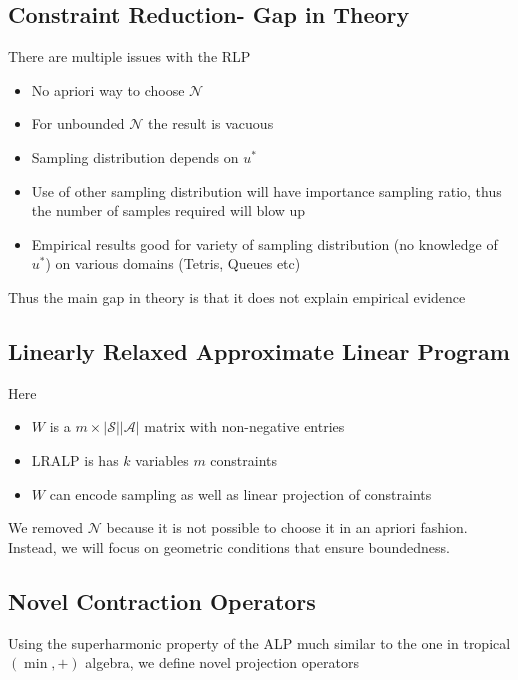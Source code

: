 \documentclass{article}
\renewcommand{\S}{\mathcal{S}}
\newcommand{\A}{\mathcal{A}}
\newcommand{\minp}{(\min,+)}
\newcommand{\N}{\mathcal{N}}
\begin{document}
\subsection{Constraint Reduction- Gap in Theory}
There are multiple issues with the RLP
\begin{itemize}
\item No apriori way to choose $\N$
\item For unbounded $\N$ the result is vacuous
\item Sampling distribution depends on $u^*$
\item Use of other sampling distribution will have importance sampling ratio, thus the number of samples required will blow up
\item \cite{farias2006tetris,de2003linear,de2004constraint} Empirical results good for variety of sampling distribution (no knowledge of $u^*$) on various domains (Tetris, Queues etc)
\end{itemize}

Thus the main gap in theory is that it does not explain empirical evidence

\subsection{Linearly Relaxed Approximate Linear Program}
Here
\begin{itemize}
\item $W$ is a $m\times |\S||\A|$ matrix with non-negative entries
\item LRALP is has $k$ variables $m$ constraints
\item $W$ can encode sampling as well as linear projection of constraints
\end{itemize}
We removed $\N$ because it is not possible to choose it in an apriori fashion. Instead, we will focus on geometric conditions that ensure boundedness.

\subsection{Novel Contraction Operators}
Using the superharmonic property of the ALP much similar to the one in tropical $\minp$ algebra, we define novel projection operators
\end{document}
